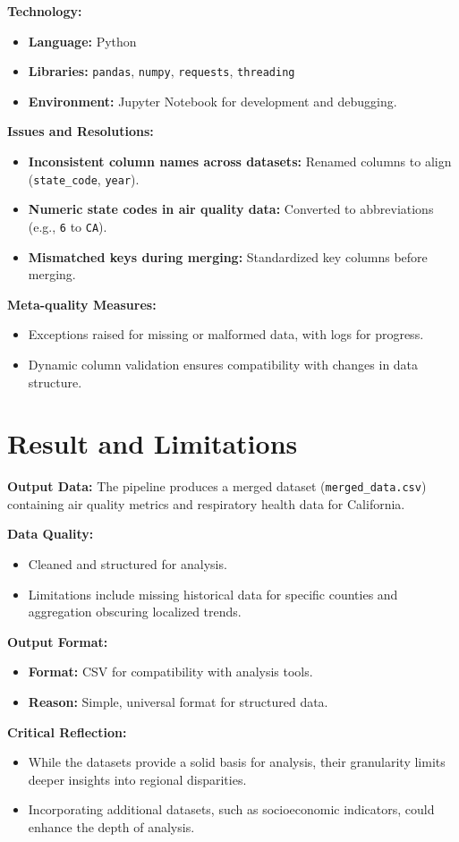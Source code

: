 \documentclass[a4paper,12pt]{article}
\begin{document}
\textbf{Technology:}
\begin{itemize}
    \item \textbf{Language:} Python
    \item \textbf{Libraries:} \texttt{pandas}, \texttt{numpy}, \texttt{requests}, \texttt{threading}
    \item \textbf{Environment:} Jupyter Notebook for development and debugging.
\end{itemize}

\textbf{Issues and Resolutions:}
\begin{itemize}
    \item \textbf{Inconsistent column names across datasets:} Renamed columns to align (\texttt{state\_code}, \texttt{year}).
    \item \textbf{Numeric state codes in air quality data:} Converted to abbreviations (e.g., \texttt{6} to \texttt{CA}).
    \item \textbf{Mismatched keys during merging:} Standardized key columns before merging.
\end{itemize}

\textbf{Meta-quality Measures:}
\begin{itemize}
    \item Exceptions raised for missing or malformed data, with logs for progress.
    \item Dynamic column validation ensures compatibility with changes in data structure.
\end{itemize}

\section*{Result and Limitations}

\textbf{Output Data:}  
The pipeline produces a merged dataset (\texttt{merged\_data.csv}) containing air quality metrics and respiratory health data for California.  

\textbf{Data Quality:}
\begin{itemize}
    \item Cleaned and structured for analysis.
    \item Limitations include missing historical data for specific counties and aggregation obscuring localized trends.
\end{itemize}

\textbf{Output Format:}
\begin{itemize}
    \item \textbf{Format:} CSV for compatibility with analysis tools.
    \item \textbf{Reason:} Simple, universal format for structured data.
\end{itemize}

\textbf{Critical Reflection:}
\begin{itemize}
    \item While the datasets provide a solid basis for analysis, their granularity limits deeper insights into regional disparities.
    \item Incorporating additional datasets, such as socioeconomic indicators, could enhance the depth of analysis.
\end{itemize}
\end{document}
